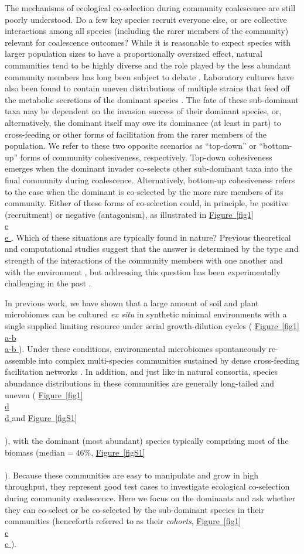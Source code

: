 \documentclass[a4paper,10pt]{article}
\newcommand{\figref}[2][]{%
  \hyperref[{#2}]{%
    Figure~\ref*{#2}%
    \ifx\\#1\\%
    \else
      #1%
    \fi
  }%
}
\begin{document}
The mechanisms of ecological co-selection during community coalescence are still poorly understood.
Do a few key species recruit everyone else, or are collective interactions among all species
(including the rarer members of the community) relevant for coalescence outcomes?
While it is reasonable to expect species with larger population sizes to have a proportionally oversized effect,
natural communities tend to be highly diverse \cite{Louca2016}
and
the role played by the less abundant community members has long been subject to debate \cite{Winfree2015}.
Laboratory cultures have also been found to contain uneven distributions of multiple strains that feed
off the metabolic secretions of the dominant species \cite{Rosenzweig1994,Goldford2018}.
The fate of these sub-dominant taxa may be dependent on the invasion success of their dominant
species, or, alternatively, the dominant itself may owe its dominance (at least in part) to cross-feeding
or other forms of facilitation from the rarer members of the population.
We refer to these two opposite scenarios as
``top-down'' or ``bottom-up'' forms of community cohesiveness, respectively.
Top-down cohesiveness emerges when the dominant invader co-selects other sub-dominant taxa
into the final community during coalescence.
Alternatively, bottom-up cohesiveness refers to the case when the dominant is co-selected by
the more rare members of its community.
Either of these forms of co-selection could, in principle, be positive (recruitment) or negative (antagonism),
as illustrated in \figref[e]{fig1}.
Which of these situations are typically found in nature?
Previous theoretical and computational studies suggest that the answer is determined by the type and
strength of the interactions of the community members with one another and with the environment
\cite{Tikhonov2016,Vila2019,Lechon2021},
but addressing this question has been experimentally challenging in the past \cite{Rillig2017,Sierocinski2017}.

In previous work, we have shown that a large amount of soil and plant microbiomes can be cultured
\textit{ex situ} in synthetic minimal environments with a single supplied limiting resource under serial
growth-dilution cycles \cite{Goldford2018} (\figref[a-b]{fig1}). Under these conditions, environmental
microbiomes spontaneously re-assemble into complex multi-species communities sustained by dense
cross-feeding facilitation networks \cite{Goldford2018}. In addition,
and just like in natural consortia,
species abundance distributions
in these communities are generally long-tailed and uneven (\figref[d]{fig1} and \figref{figS1}),
with the dominant (most abundant) species typically comprising most of the biomass ($\text{median}=46\%$,
\figref{figS1}). Because these communities are easy to manipulate and grow in high throughput,
they represent good test cases to investigate ecological
co-selection during community coalescence. Here we focus on the dominants and ask whether they can
co-select or be co-selected by the sub-dominant species in their communities (henceforth referred to as
their \textit{cohorts}, \figref[c]{fig1}).
\end{document}
